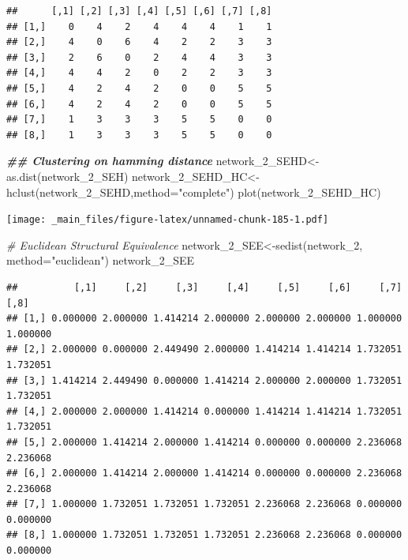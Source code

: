 \documentclass[
  notitlepage,
  onecolumn,
  openany]{book}
\newenvironment{Shaded}{\begin{snugshade}}{\end{snugshade}}
\newcommand{\AttributeTok}[1]{\textcolor[rgb]{0.77,0.63,0.00}{#1}}
\newcommand{\CommentTok}[1]{\textcolor[rgb]{0.56,0.35,0.01}{\textit{#1}}}
\newcommand{\DocumentationTok}[1]{\textcolor[rgb]{0.56,0.35,0.01}{\textbf{\textit{#1}}}}
\newcommand{\FunctionTok}[1]{\textcolor[rgb]{0.00,0.00,0.00}{#1}}
\newcommand{\NormalTok}[1]{#1}
\newcommand{\OtherTok}[1]{\textcolor[rgb]{0.56,0.35,0.01}{#1}}
\newcommand{\StringTok}[1]{\textcolor[rgb]{0.31,0.60,0.02}{#1}}
\begin{document}
\begin{verbatim}
##      [,1] [,2] [,3] [,4] [,5] [,6] [,7] [,8]
## [1,]    0    4    2    4    4    4    1    1
## [2,]    4    0    6    4    2    2    3    3
## [3,]    2    6    0    2    4    4    3    3
## [4,]    4    4    2    0    2    2    3    3
## [5,]    4    2    4    2    0    0    5    5
## [6,]    4    2    4    2    0    0    5    5
## [7,]    1    3    3    3    5    5    0    0
## [8,]    1    3    3    3    5    5    0    0
\end{verbatim}

\begin{Shaded}
\begin{Highlighting}[]
\DocumentationTok{\#\# Clustering on hamming distance}
\NormalTok{network\_2\_SEHD}\OtherTok{\textless{}{-}}\FunctionTok{as.dist}\NormalTok{(network\_2\_SEH)}
\NormalTok{network\_2\_SEHD\_HC}\OtherTok{\textless{}{-}}\FunctionTok{hclust}\NormalTok{(network\_2\_SEHD,}\AttributeTok{method=}\StringTok{"complete"}\NormalTok{)}
\FunctionTok{plot}\NormalTok{(network\_2\_SEHD\_HC)}
\end{Highlighting}
\end{Shaded}

\texttt{[image: \_main\_files/figure-latex/unnamed-chunk-185-1.pdf]}

\begin{Shaded}
\begin{Highlighting}[]
\CommentTok{\# Euclidean Structural Equivalence}
\NormalTok{network\_2\_SEE}\OtherTok{\textless{}{-}}\FunctionTok{sedist}\NormalTok{(network\_2, }\AttributeTok{method=}\StringTok{"euclidean"}\NormalTok{)}
\NormalTok{network\_2\_SEE}
\end{Highlighting}
\end{Shaded}

\begin{verbatim}
##          [,1]     [,2]     [,3]     [,4]     [,5]     [,6]     [,7]     [,8]
## [1,] 0.000000 2.000000 1.414214 2.000000 2.000000 2.000000 1.000000 1.000000
## [2,] 2.000000 0.000000 2.449490 2.000000 1.414214 1.414214 1.732051 1.732051
## [3,] 1.414214 2.449490 0.000000 1.414214 2.000000 2.000000 1.732051 1.732051
## [4,] 2.000000 2.000000 1.414214 0.000000 1.414214 1.414214 1.732051 1.732051
## [5,] 2.000000 1.414214 2.000000 1.414214 0.000000 0.000000 2.236068 2.236068
## [6,] 2.000000 1.414214 2.000000 1.414214 0.000000 0.000000 2.236068 2.236068
## [7,] 1.000000 1.732051 1.732051 1.732051 2.236068 2.236068 0.000000 0.000000
## [8,] 1.000000 1.732051 1.732051 1.732051 2.236068 2.236068 0.000000 0.000000
\end{verbatim}
\end{document}
